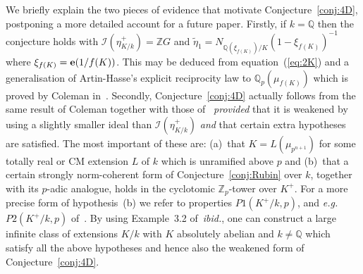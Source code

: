 \documentclass[12pt]{article}
\newcounter{rem}[section]%
\newcommand{\bbQ}{\ensuremath{\mathbb{Q}}}
\newcommand{\bbZ}{\ensuremath{\mathbb{Z}}}
\newcommand{\be}{\ensuremath{{\bf e}}}
\newcommand{\cI}{\ensuremath{\mathcal{I}}}
\newcommand{\eg}{\emph{e.g.}}
\newcommand{\inv}{^{-1}}%
\newcommand{\refeq}[1]{~(\ref{eq:#1})}
\newcommand{\rem}{\refstepcounter{rem}\noindent{\sc Remark \therem}}%
\renewcommand{\therem}{\thesection.\arabic{rem}}
\newcommand{\pnpo}{\ensuremath{{p^{n+1}}}}
\begin{document}
We briefly explain the two pieces of evidence that
motivate Conjecture~\ref{conj:4D}, postponing a
more detailed account for a future paper. Firstly, if $k=\bbQ$
then the conjecture holds with $\cI(\eta^+_{K/k})=\bbZ G$ and $\tilde{\eta}_1=
N_{\bbQ(\xi_{f(K)})/K}(1-\xi_{f(K)})\inv$ where $\xi_{f(K)}=\be(1/f(K))$.
This may be deduced from equation\refeq{2K} and a generalisation of Artin-Hasse's
explicit reciprocity law to $\bbQ_p(\mu_{f(K)})$ which is proved by Coleman
in~\cite{Coleman2}.
Secondly, Conjecture~\ref{conj:4D} actually follows from
the same result of Coleman together with those of~\cite{sconzp}
\emph{provided} that it is weakened by using a slightly smaller ideal
than $\cI(\eta^+_{K/k})$ \emph{and}
that certain extra hypotheses are satisfied. The most important of these
are: (a)~that $K=L(\mu_\pnpo)$ for some totally real or CM extension
$L$ of $k$ which is unramified above $p$ and (b)~that a certain
strongly norm-coherent form of Conjecture~\ref{conj:Rubin} over
$k$, together with its $p$-adic analogue, holds in the cyclotomic $\bbZ_p$-tower over $K^+$.
For a more precise form of hypothesis~(b) we refer to properties
$P1(K^+/k,p)$, and \eg\ $P2(K^+/k,p)$ of~\cite[\S 3]{sconzp}. By using Example~3.2
of~\emph{ibid.}, one can construct a large infinite class of
extensions $K/k$ with $K$ absolutely abelian and $k\neq \bbQ$ which satisfy all the above
hypotheses and hence also the weakened form of Conjecture~\ref{conj:4D}.
\end{document}
